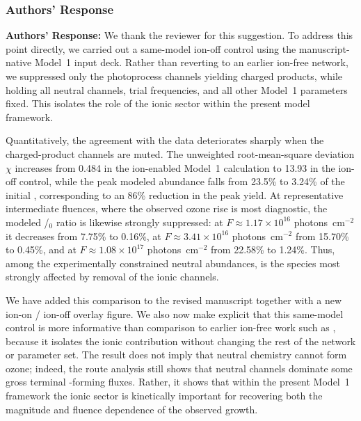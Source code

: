 \documentclass[12pt]{article}
\newcommand{\responselabel}{\textbf{\textcolor{responseframe}{Authors' Response:}}}
\begin{document}
\subsubsection{Authors' Response}
\begin{responsebox}
\responselabel{} We thank the reviewer for this suggestion. To address this
point directly, we carried out a same-model ion-off control using the
manuscript-native Model~1 input deck. Rather than reverting to an earlier
ion-free network, we suppressed only the photoprocess channels yielding
charged products, while holding all neutral channels, trial frequencies, and
all other Model~1 parameters fixed. This isolates the role of the ionic
sector within the present model framework.

Quantitatively, the agreement with the \citet{gerakines_ultraviolet_1996}
 data deteriorates sharply when the charged-product channels are
muted. The unweighted root-mean-square deviation $\chi$ increases from 0.484
in the ion-enabled Model~1 calculation to 13.93 in the ion-off control, while
the peak modeled  abundance falls from 23.5\% to 3.24\% of the initial
, corresponding to an 86\% reduction in the peak yield. At
representative intermediate fluences, where the observed ozone rise is most
diagnostic, the modeled /$_0$ ratio is likewise strongly
suppressed: at $F \approx 1.17\times10^{16}$ photons~cm$^{-2}$ it decreases
from 7.75\% to 0.16\%, at $F \approx 3.41\times10^{16}$ photons~cm$^{-2}$ from
15.70\% to 0.45\%, and at $F \approx 1.08\times10^{17}$ photons~cm$^{-2}$ from
22.58\% to 1.24\%. Thus, among the experimentally constrained neutral
abundances,  is the species most strongly affected by removal of the
ionic channels.

We have added this comparison to the revised manuscript together with a new
ion-on / ion-off overlay figure. We also now make explicit that this
same-model control is more informative than comparison to earlier ion-free
work such as \citet{mullikin_new_2021}, because it isolates the ionic
contribution without changing the rest of the network or parameter set. The
result does not imply that neutral chemistry cannot form ozone; indeed, the
route analysis still shows that neutral channels dominate some gross terminal
-forming fluxes. Rather, it shows that within the present Model~1
framework the ionic sector is kinetically important for recovering both the
magnitude and fluence dependence of the observed  growth.
\end{responsebox}
\end{document}
